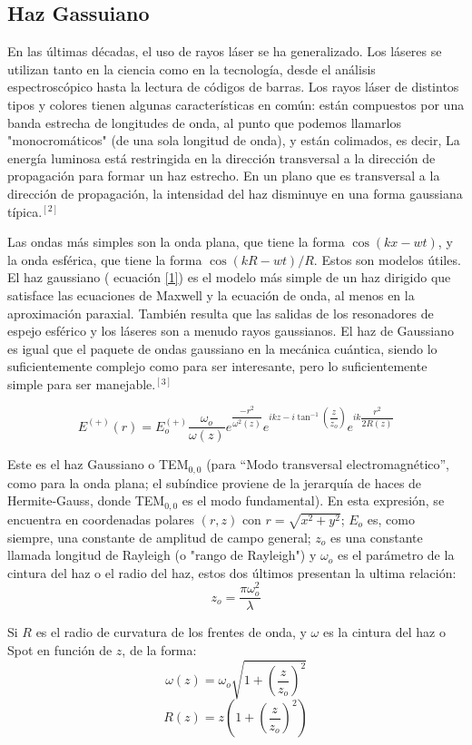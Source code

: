\documentclass[11pt,letterpaper,twocolumn]{article}
\begin{document}
\subsection*{Haz Gassuiano}
En las últimas décadas, el uso de rayos láser se ha generalizado. Los láseres se utilizan tanto en la ciencia como en la tecnología, desde el análisis espectroscópico hasta la lectura de códigos de barras. Los rayos láser de distintos tipos y colores tienen algunas características en común: están compuestos por una banda estrecha de longitudes de onda, al punto que podemos llamarlos "monocromáticos" (de una sola longitud de onda), y están colimados, es decir, La energía luminosa está restringida en la dirección transversal a la dirección de propagación para formar un haz estrecho. En un plano que es transversal a la dirección de propagación, la intensidad del haz disminuye en una forma gaussiana típica.$^{[2]}$\\
\par 
Las ondas más simples son la onda plana, que tiene la forma $\cos(kx-wt)$, y la onda esférica, que tiene la forma $\cos(kR-wt)/R$. Estos son modelos útiles. El haz gaussiano ( ecuación \ref{1}) es el modelo más simple de un haz dirigido que satisface las ecuaciones de Maxwell y la ecuación de onda, al menos en la aproximación paraxial. También resulta que las salidas de los resonadores de espejo esférico y los láseres son a menudo rayos gaussianos. El haz de Gaussiano es igual que el paquete de ondas gaussiano en la mecánica cuántica, siendo lo suficientemente complejo como para ser interesante, pero lo suficientemente simple para ser manejable.$^{[3]}$

\begin{equation}
E^{(+)}(r)=E_{o}^{(+)} \dfrac{\omega_{o}}{\omega (z)} e^{\dfrac{-r^{2}}{\omega^{2}(z)}} e^{ikz-i\tan^{-1}(\dfrac{z}{z_{o}})} e^{ik\dfrac{r^{2}}{2R(z)}}
\label{1}
\end{equation}
\par 
Este es el haz Gaussiano o TEM$_{0,0}$ (para “Modo transversal electromagnético”, como para la onda plana; el subíndice proviene de la jerarquía de haces de Hermite-Gauss, donde TEM$_{0,0}$ es el modo fundamental). En esta expresión, se encuentra en coordenadas polares $(r,z)$ con $r=\sqrt{x^2 + y^2}$; $E_{o}$ es, como siempre, una constante de amplitud de campo general; $z_{o}$ es una constante llamada longitud de Rayleigh (o "rango de Rayleigh") y $\omega_{o}$ es el parámetro de la cintura del haz o el radio del haz, estos dos últimos presentan la ultima relación: 
$$z_{o}=\dfrac{\pi \omega_{o}^{2}}{\lambda}$$
\par 
Si $R$ es el radio de curvatura de los frentes de onda, y $\omega$ es la cintura del haz o Spot en función de $z$, de la forma:
$$\omega(z)=\omega_{o}\sqrt{1+(\dfrac{z}{z_{o}})^{2}}$$
$$R(z)=z(1+(\dfrac{z}{z_{o}})^{2})$$
\end{document}
